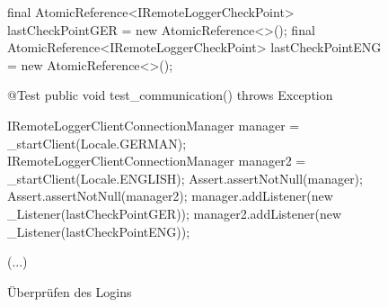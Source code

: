 \begin{figure}[h]
    \centering
   	\begin{spacing}{0.75}
   		\begin{javacode}[firstnumber=1]
final AtomicReference<IRemoteLoggerCheckPoint> lastCheckPointGER = new AtomicReference<>();
final AtomicReference<IRemoteLoggerCheckPoint> lastCheckPointENG = new AtomicReference<>();

@Test
public void test_communication() throws Exception
{		
  IRemoteLoggerClientConnectionManager manager = _startClient(Locale.GERMAN);
  IRemoteLoggerClientConnectionManager manager2 = _startClient(Locale.ENGLISH);
  Assert.assertNotNull(manager);
  Assert.assertNotNull(manager2);
  manager.addListener(new _Listener(lastCheckPointGER));
  manager2.addListener(new _Listener(lastCheckPointENG));
  
  (...)
  
}\end{javacode}
   	\end{spacing}
   	\caption{Überprüfen des Logins}
\end{figure}